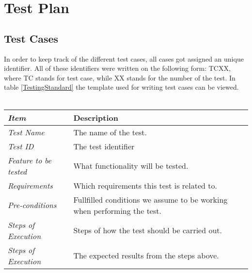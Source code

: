


\chapter{Test Plan}
\label{chap:TestingTPlan}


\section{Test Cases}
\label{sec:TestCases}

In order to keep track of the different test cases, all cases got assigned an unique identifier. All of these identifiers were written on the following form: TCXX, where TC stands for test case, while XX stands for the number of the test. In table \ref{TestingStandard} the template used for writing test cases can be viewed. \\ \\
%
\begin{minipage}{\linewidth}
\setlength{\tabcolsep}{15pt}
\centering
{}
\begin{tabular}{ |l|p{70mm}| }
	\hline
	\it{\cellcolor{gray!25}Item} & {\cellcolor{gray!25} Description } \\
	\hline
	\it{\cellcolor{gray!25}Test Name } & The name of the test.  \\ \hline
	\it{\cellcolor{gray!25}Test ID} & The test identifier  \\ \hline
	\it{\cellcolor{gray!25}Feature to be tested} & What functionality will be tested.  \\ \hline
	\it{\cellcolor{gray!25}Requirements} & Which requirements this test is related to.  \\ \hline
	\it{\cellcolor{gray!25}Pre-conditions} & Fullfilled conditions we assume to be working when performing the test.  \\ \hline
	\it{\cellcolor{gray!25}Steps of Execution} & Steps of how the test should be carried out.  \\ \hline
	\it{\cellcolor{gray!25}Steps of Execution} & The expected results from the steps above.  \\
	\hline
\end{tabular}
\end{minipage}

